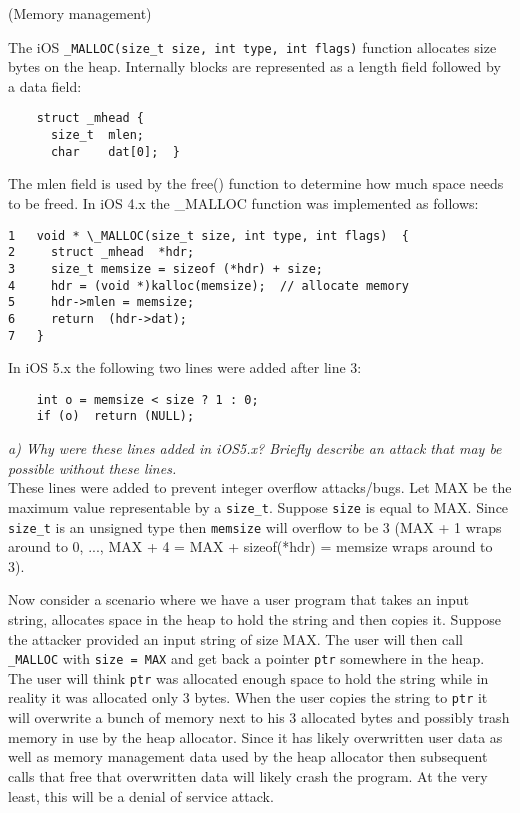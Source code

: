 \begin{prob}  (Memory management) 
\end{prob}

\noindent The iOS  \verb+_MALLOC(size_t size, int type, int flags)+ function allocates size bytes on the heap. Internally blocks are represented as a length field followed by a data field:
\begin{verbatim}
    struct _mhead {
      size_t  mlen;
      char    dat[0];  }
\end{verbatim}
The mlen field is used by the free() function to determine how much space needs to be freed. In iOS 4.x the \_MALLOC function was implemented as follows:
\begin{verbatim}
1   void * \_MALLOC(size_t size, int type, int flags)  {
2     struct _mhead  *hdr;
3     size_t memsize = sizeof (*hdr) + size;
4     hdr = (void *)kalloc(memsize);  // allocate memory
5     hdr->mlen = memsize;
6     return  (hdr->dat);
7   }
\end{verbatim}
In iOS 5.x the following two lines were added after line 3:
\begin{verbatim}
    int o = memsize < size ? 1 : 0;
    if (o)  return (NULL);
\end{verbatim}
    
\noindent \textit{a) Why were these lines added in iOS5.x? Briefly describe an attack that may be possible without these lines.}\\

\noindent  These lines were added to prevent integer overflow attacks/bugs. Let MAX be the maximum value representable by a \verb+size_t+. Suppose \verb+size+ is equal to MAX. Since \verb+size_t+ is an unsigned type then \verb+memsize+ will overflow to be 3 (MAX + 1 wraps around to 0, ..., MAX + 4 = MAX + sizeof(*hdr) = memsize wraps around to 3). 

Now consider a scenario where we have a user program that takes an input string, allocates space in the heap to hold the string and then copies it. Suppose the attacker provided an input string of size MAX. The user will then call \verb+_MALLOC+ with \verb+size = MAX+ and get back a pointer \verb+ptr+ somewhere in the heap. The user will think \verb+ptr+ was allocated enough space to hold the string while in reality it was allocated only 3 bytes. When the user copies the string to \verb+ptr+ it will overwrite a bunch of memory next to his 3 allocated bytes and possibly trash memory in use by the heap allocator. Since it has likely overwritten user data as well as memory management data used by the heap allocator  then subsequent calls that free that overwritten data will likely crash the program. At the very least, this will be a denial of service attack. 

